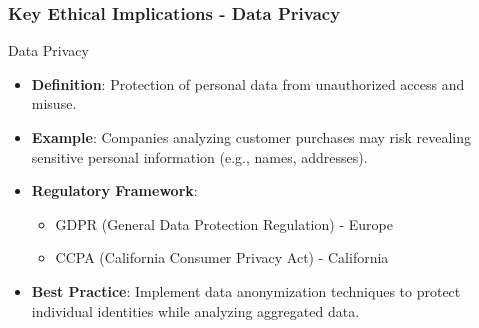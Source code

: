 \documentclass{beamer}
\begin{document}
\begin{frame}[fragile]
    \frametitle{Key Ethical Implications - Data Privacy}
    
    \begin{block}{Data Privacy}
        \begin{itemize}
            \item \textbf{Definition}: Protection of personal data from unauthorized access and misuse.
            \item \textbf{Example}: Companies analyzing customer purchases may risk revealing sensitive personal information (e.g., names, addresses).
            \item \textbf{Regulatory Framework}:
            \begin{itemize}
                \item GDPR (General Data Protection Regulation) - Europe
                \item CCPA (California Consumer Privacy Act) - California
            \end{itemize}
            \item \textbf{Best Practice}: Implement data anonymization techniques to protect individual identities while analyzing aggregated data.
        \end{itemize}
    \end{block}
\end{frame}
\end{document}
